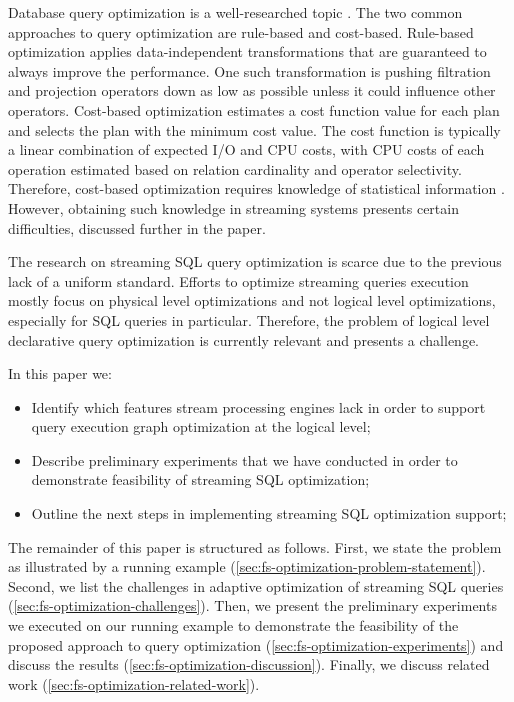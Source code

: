 Database query optimization is a well-researched topic \cite{astrahan1976system, haas1989extensible, graefe1993volcano}. 
The two common approaches to query optimization are rule-based and cost-based. Rule-based optimization applies data-independent transformations that are guaranteed to always improve the performance. One such transformation is pushing filtration and projection operators down as low as possible unless it could influence other operators. Cost-based optimization estimates a cost function value for each plan and selects the plan with the minimum cost value. The cost function is typically a linear combination of expected I/O and CPU costs, with CPU costs of each operation estimated based on relation cardinality and operator selectivity. Therefore, cost-based optimization requires knowledge of statistical information \cite{Neumann2018optimization}. However, obtaining such knowledge in streaming systems presents certain difficulties, discussed further in the paper.


The research on streaming SQL query optimization is scarce due to the previous lack of a uniform standard. Efforts to optimize streaming queries execution mostly focus on physical level optimizations \cite{grulich2020grizzly, gedik2009code} and not logical level optimizations, especially for SQL queries in particular. Therefore, the problem of logical level declarative query optimization is currently relevant and presents a challenge.


In this paper we:
\begin{itemize}
    \item Identify which features stream processing engines lack in order to support query execution graph optimization at the logical level;
    \item Describe preliminary experiments that we have conducted in order to demonstrate feasibility of streaming SQL optimization;
    \item Outline the next steps in implementing streaming SQL optimization support; %
\end{itemize}

The remainder of this paper is structured as follows. First, we state the problem as illustrated by a running example (\ref{sec:fs-optimization-problem-statement}). Second, we list the challenges in adaptive optimization of streaming SQL queries (\ref{sec:fs-optimization-challenges}). Then, we present the preliminary experiments we executed on our running example to demonstrate the feasibility of the proposed approach to query optimization (\ref{sec:fs-optimization-experiments}) and discuss the results (\ref{sec:fs-optimization-discussion}). Finally, we discuss related work (\ref{sec:fs-optimization-related-work}).     




